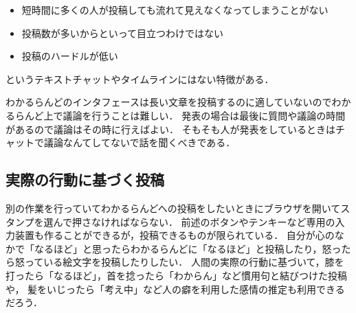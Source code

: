 \begin{itemize}
\item 短時間に多くの人が投稿しても流れて見えなくなってしまうことがない
\item 投稿数が多いからといって目立つわけではない
\item 投稿のハードルが低い
\end{itemize}
というテキストチャットやタイムラインにはない特徴がある．

わかるらんどのインタフェースは長い文章を投稿するのに適していないのでわかるらんど上で議論を行うことは難しい．
発表の場合は最後に質問や議論の時間があるので議論はその時に行えばよい．
そもそも人が発表をしているときはチャットで議論なんてしてないで話を聞くべきである．

\subsection{実際の行動に基づく投稿}

別の作業を行っていてわかるらんどへの投稿をしたいときにブラウザを開いてスタンプを選んで押さなければならない．
前述のボタンやテンキーなど専用の入力装置も作ることができるが，投稿できるものが限られている．
自分が心のなかで「なるほど」と思ったらわかるらんどに「なるほど」と投稿したり，怒ったら怒っている絵文字を投稿したりしたい．
人間の実際の行動に基づいて，膝を打ったら「なるほど」，首を捻ったら「わからん」など慣用句と結びつけた投稿や，
髪をいじったら「考え中」など人の癖を利用した感情の推定も利用できるだろう．